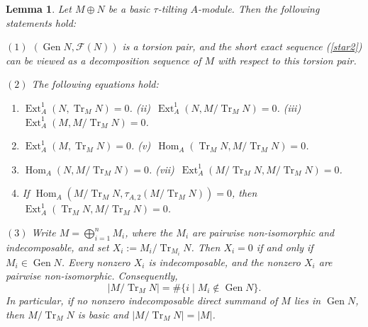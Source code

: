 \documentclass[reqno,12pt]{amsart}
\numberwithin{equation}{section}
\theoremstyle{plain}
\newtheorem{lemma}[theorem]{\bf Lemma}
\theoremstyle{definition}
\begin{document}
\begin{lemma}\label{3.2}
Let \(M\oplus N\) be a basic \(\tau\)-tilting $A$-module. Then the following statements hold:

$(1)$ \( (\operatorname{Gen} N, \mathcal{F}(N)) \) is a torsion pair, and the short exact sequence (\ref{star2}) can be viewed as a decomposition sequence of \( M \) with respect to this torsion pair.

$(2)$ The following equations hold:
\begin{enumerate}
\item[(i)] \( \operatorname{Ext}_A^1(N,\operatorname{Tr}_M N) = 0 \). {\rm(ii)}~\( \operatorname{Ext}_A^1(N, M / {\operatorname{Tr}_M N}) = 0 \). {\rm(iii)}~\( \operatorname{Ext}_A^1(M, M / {\operatorname{Tr}_M N}) = 0 \).
\item[(iv)] \( \operatorname{Ext}_A^1(M,\operatorname{Tr}_MN) = 0 \). {\rm(v)}~\( \operatorname{Hom}_A(\operatorname{Tr}_MN, M / {\operatorname{Tr}_M N}) = 0 \).
\item[(vi)] \( \operatorname{Hom}_A(N, M /{\operatorname{Tr}_MN}) = 0 \). {\rm(vii)}~\( \operatorname{Ext}_A^1(M / {\operatorname{Tr}_MN}, M /{\operatorname{Tr}_MN}) = 0 \).
\item[(viii)] If \( \operatorname{Hom}_A(M / {\operatorname{Tr}_MN}, \tau_{A,2}(M / \operatorname{Tr}_M N)) = 0 \), then
\(\operatorname{Ext}_A^1(\operatorname{Tr}_MN, M /{\operatorname{Tr}_M N}) = 0 \).
\end{enumerate}

$(3)$ Write $M=\bigoplus_{i=1}^nM_i$, where the $M_i$ are
pairwise non-isomorphic and indecomposable, and set
$X_i:=M_i/\operatorname{Tr}_{M_i}N$. Then $X_i=0$ if and only if $M_i\in\operatorname{Gen}N$. Every nonzero $X_i$ is indecomposable, and the nonzero $X_i$ are pairwise non-isomorphic. Consequently,
\[
\left|M/\operatorname{Tr}_MN\right|
=\#\{i\mid M_i\notin\operatorname{Gen}N\}.
\]
In particular, if no nonzero indecomposable direct summand of $M$ lies in $\operatorname{Gen}N$, then $M/\operatorname{Tr}_MN$ is basic and
$|M/\operatorname{Tr}_MN|=|M|$.
\end{lemma}
\end{document}
